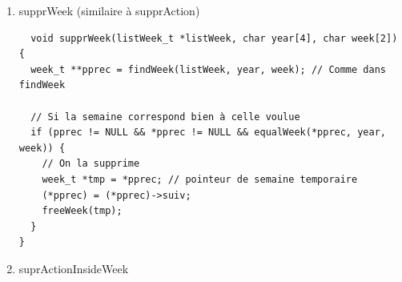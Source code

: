 \documentclass[11pt]{article}
\begin{document}
\begin{enumerate}
\begin{lstlisting}
  week_t **insertWeek(listWeek_t *listWeek, week_t *nouvWeek) {
  week_t **prec; // Comme dans findWeek

  if (nouvWeek != NULL) {
    prec = findWeek(listWeek, nouvWeek->year, nouvWeek->numWeek);

    // S'il existe déjà une liste dans ce créneau.
    if ((*prec) != NULL &&
	equalWeek((*prec), nouvWeek->year, nouvWeek->numWeek)) {

      printf("THIS WEEK ALREADY EXIST, NO NEED TO ADD IT\n");

      // On libère celle en trop.
      freeWeek(nouvWeek);

    }

    // Sinon on l'ajoute
    else {
      nouvWeek->suiv = (*prec);
      *prec = nouvWeek;
    }
  }
  return prec;
}
\end{lstlisting}


\item supprWeek (similaire à supprAction)
\label{sec:org12de15c}

\begin{lstlisting}
  void supprWeek(listWeek_t *listWeek, char year[4], char week[2]) {
  week_t **pprec = findWeek(listWeek, year, week); // Comme dans findWeek

  // Si la semaine correspond bien à celle voulue
  if (pprec != NULL && *pprec != NULL && equalWeek(*pprec, year, week)) {
    // On la supprime
    week_t *tmp = *pprec; // pointeur de semaine temporaire
    (*pprec) = (*pprec)->suiv;
    freeWeek(tmp);
  }
}

\end{lstlisting}


\item suprActionInsideWeek
\label{sec:org5d30ef9}


\end{enumerate}
\end{document}
